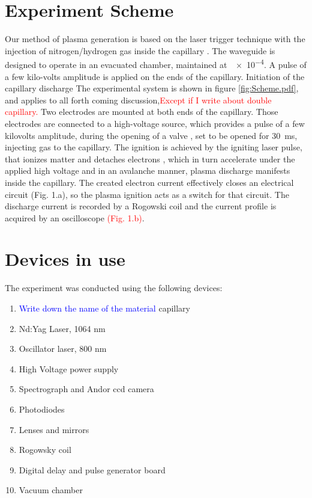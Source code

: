 \documentclass[nofonts]{tufte-book}
\begin{document}
	\section{Experiment Scheme}\label{sec:experiment_scheme}
Our method of plasma generation is based on the laser trigger technique with the injection of nitrogen/hydrogen gas inside the capillary \cite{Bobrova2002,Spence2001}.
The waveguide is designed to operate in an evacuated chamber, maintained at $~$\SI{e-4}{\torr}. A pulse of a few kilo-volts amplitude is applied on the ends of the capillary. Initiation of the capillary discharge 
The experimental system is shown in figure \ref{fig:Scheme.pdf}, and applies to all forth coming discussion,\textcolor{red}{Except if I write about double capillary.} Two electrodes are mounted at both ends of the capillary. Those electrodes are connected to a high-voltage source, which provides a pulse of a few kilovolts amplitude, during the opening of a valve , set to be opened for \SI{30}{\ms}, injecting gas to the capillary. The ignition is achieved by the igniting laser pulse, that ionizes matter and detaches electrons \cite{Palchan2007}, which in turn accelerate under the applied high voltage and in an avalanche manner, plasma discharge manifests inside the capillary. The created electron current effectively closes an electrical circuit (Fig. 1.a), so the plasma ignition acts as a switch for that circuit. The discharge current is recorded by a Rogowski coil  and the current profile is acquired by an oscilloscope \textcolor{red}{(Fig. 1.b)}.

	\section{Devices in use}\label{sec:devices}
The experiment was conducted using the following devices:
\begin{enumerate}
    \item \textcolor{blue}{Write down the name of the material} capillary
    \item Nd:Yag Laser, 1064 nm
    \item Oscillator laser, 800 nm
    \item High Voltage power supply
    \item Spectrograph and Andor ccd camera
    \item Photodiodes
    \item Lenses and mirrors
    \item Rogowsky coil
    \item Digital delay and pulse generator board
    \item Vacuum chamber
\end{enumerate}
\end{document}
